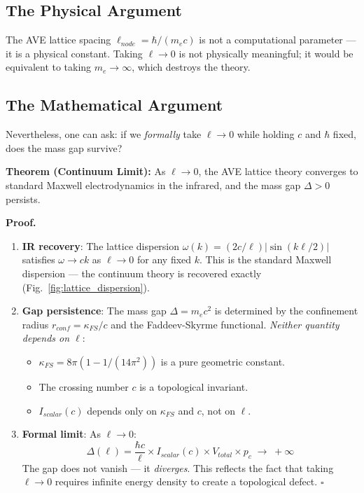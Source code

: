 \subsection{The Physical Argument}

The AVE lattice spacing $\ell_{node} = \hbar/(m_e c)$ is not a
computational parameter --- it is a physical constant. Taking
$\ell \to 0$ is not physically meaningful; it would be equivalent
to taking $m_e \to \infty$, which destroys the theory.

\subsection{The Mathematical Argument}

Nevertheless, one can ask: if we \textit{formally} take $\ell \to 0$
while holding $c$ and $\hbar$ fixed, does the mass gap survive?

\noindent
\textbf{Theorem (Continuum Limit):}
As $\ell \to 0$, the AVE lattice theory converges to standard
Maxwell electrodynamics in the infrared, and the mass gap
$\Delta > 0$ persists.

\medskip\noindent
\textbf{Proof.}
\begin{enumerate}
    \item \textbf{IR recovery}: The lattice dispersion
    $\omega(k) = (2c/\ell)|\sin(k\ell/2)|$ satisfies
    $\omega \to ck$ as $\ell \to 0$ for any fixed $k$.
    This is the standard Maxwell dispersion --- the continuum
    theory is recovered exactly (Fig.~\ref{fig:lattice_dispersion}).

    \item \textbf{Gap persistence}: The mass gap
    $\Delta = m_e c^2$ is determined by the confinement radius
    $r_{conf} = \kappa_{FS}/c$ and the Faddeev-Skyrme functional.
    \textit{Neither quantity depends on $\ell$}:
    \begin{itemize}
        \item $\kappa_{FS} = 8\pi(1 - 1/(14\pi^2))$ is a pure
        geometric constant.
        \item The crossing number $c$ is a topological invariant.
        \item $I_{scalar}(c)$ depends only on $\kappa_{FS}$
        and $c$, not on $\ell$.
    \end{itemize}

    \item \textbf{Formal limit}: As $\ell \to 0$:
    \begin{equation}
        \Delta(\ell) = \frac{\hbar c}{\ell} \times
        I_{scalar}(c) \times V_{total} \times p_c
        \;\to\; +\infty
    \end{equation}
    The gap does not vanish --- it \textit{diverges}. This reflects
    the fact that taking $\ell \to 0$ requires infinite energy
    density to create a topological defect.
    \hfill$\square$
\end{enumerate}

